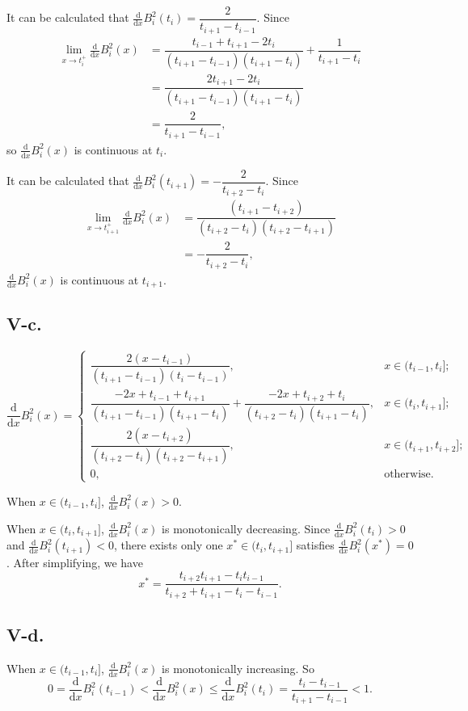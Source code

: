 \documentclass[a4paper]{article}
\begin{document}
It can be calculated that $\frac{\mathrm{d}}{\mathrm{d}x}B_i^2(t_i)=\dfrac{2}{t_{i+1}-t_{i-1}}$. Since
$$
\begin{aligned}
  \lim_{x\rightarrow t_{i}^+} \frac{\mathrm{d}}{\mathrm{d}x}B_i^2(x)&=\dfrac{t_{i-1}+t_{i+1}-2t_i}{(t_{i+1}-t_{i-1})(t_{i+1}-t_i)}+\dfrac{1}{t_{i+1}-t_i}\\
  &=\dfrac{2t_{i+1}-2t_i}{(t_{i+1}-t_{i-1})(t_{i+1}-t_i)}\\
  &=\dfrac{2}{t_{i+1}-t_{i-1}},
\end{aligned}
$$
so $\frac{\mathrm{d}}{\mathrm{d}x}B_i^2(x)$ is continuous at $t_i$.

It can be calculated that $\frac{\mathrm{d}}{\mathrm{d}x}B_i^2(t_{i+1})=-\dfrac{2}{t_{i+2}-t_{i}}$. Since
$$
\begin{aligned}
  \lim_{x\rightarrow t_{i+1}^+} \frac{\mathrm{d}}{\mathrm{d}x}B_i^2(x)&=\dfrac{(t_{i+1}-t_{i+2})}{(t_{i+2}-t_{i})(t_{i+2}-t_{i+1})}\\
  &=-\dfrac{2}{t_{i+2}-t_{i}},
\end{aligned}
$$
$\frac{\mathrm{d}}{\mathrm{d}x}B_i^2(x)$ is continuous at $t_{i+1}$.

\subsection*{V-c.}
$$
\frac{\mathrm{d}}{\mathrm{d}x}B_i^2(x)=\begin{cases}
  \dfrac{2(x-t_{i-1})}{(t_{i+1}-t_{i-1})(t_i-t_{i-1})},&x\in(t_{i-1},t_i];\\
  \dfrac{-2x+t_{i-1}+t_{i+1}}{(t_{i+1}-t_{i-1})(t_{i+1}-t_i)}+\dfrac{-2x+t_{i+2}+t_i}{(t_{i+2}-t_i)(t_{i+1}-t_i)},&x\in(t_i,t_{i+1}];\\
  \dfrac{2(x-t_{i+2})}{(t_{i+2}-t_i)(t_{i+2}-t_{i+1})},&x\in(t_{i+1},t_{i+2}];\\
  0,&\text{otherwise.}
\end{cases}
$$

When $x\in (t_{i-1},t_{i}]$, $\frac{\mathrm{d}}{\mathrm{d}x}B_i^2(x)>0$.

When $x\in (t_{i},t_{i+1}]$, $\frac{\mathrm{d}}{\mathrm{d}x}B_i^2(x)$ is monotonically decreasing. Since $\frac{\mathrm{d}}{\mathrm{d}x}B_i^2(t_i)>0$ and $\frac{\mathrm{d}}{\mathrm{d}x}B_i^2(t_{i+1})<0$, 
there exists only one $x^{*}\in (t_{i},t_{i+1}]$ satisfies $\frac{\mathrm{d}}{\mathrm{d}x}B_i^2(x^{*})=0$. After simplifying, we have 
$$
x^{*}=\dfrac{t_{i+2}t_{i+1}-t_{i}t_{i-1}}{t_{i+2}+t_{i+1}-t_{i}-t_{i-1}}.
$$

\subsection*{V-d.}
When $x\in (t_{i-1},t_{i}]$, $\frac{\mathrm{d}}{\mathrm{d}x}B_i^2(x)$ is monotonically increasing. So 
$$0=\frac{\mathrm{d}}{\mathrm{d}x}B_i^2(t_{i-1})<\frac{\mathrm{d}}{\mathrm{d}x}B_i^2(x)\leq \frac{\mathrm{d}}{\mathrm{d}x}B_i^2(t_i)=\dfrac{t_i-t_{i-1}}{t_{i+1}-t_{i-1}}<1.$$
\end{document}
